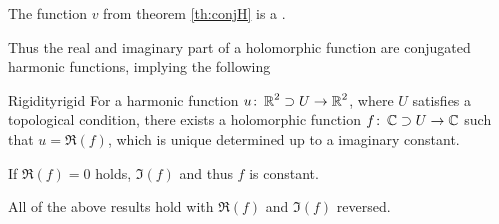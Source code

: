 \documentclass[a4paper,english]{article}
\begin{document}
\begin{defn}
    The function $v$ from theorem \ref{th:conjH} is a .
\end{defn}

Thus the real and imaginary part of a holomorphic function are conjugated harmonic functions, implying the following
\begin{thm}{Rigidity}{rigid}
    For a harmonic function $u \colon \operatorname{\mathbb{R}}^2 \supset U \to \operatorname{\mathbb{R}}^2$, where $U$ satisfies a topological condition, there exists a holomorphic function $f \colon \operatorname{\mathbb{C}} \supset U \to \operatorname{\mathbb{C}}$ such that $u = \Re(f)$, which is unique determined up to a imaginary constant.
\end{thm}

\begin{cor}[$\Re(f) = 0 \implies f \equiv C$]
    If $\Re(f) = 0$ holds, $\Im(f)$ and thus $f$ is constant.
\end{cor}

All of the above results hold with $\Re(f)$ and $\Im(f)$ reversed.
\end{document}
